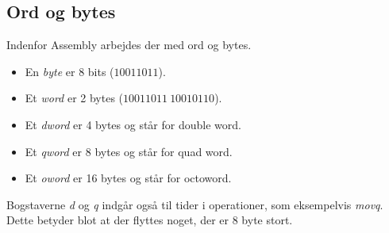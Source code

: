 \subsection{Ord og bytes}
Indenfor Assembly arbejdes der med ord og bytes.
\begin{itemize}
    \item En \textit{byte} er 8 bits ($10011011$).
    \item Et \textit{word} er 2 bytes ($10011011\:10010110$).
    \item Et \textit{dword} er 4 bytes og står for double word.
    \item Et \textit{qword} er 8 bytes og står for quad word.
    \item Et \textit{oword} er 16 bytes og står for octoword.
\end{itemize}
Bogstaverne \textit{d} og \textit{q} indgår også til tider i operationer, som eksempelvis \textit{movq}.
Dette betyder blot at der flyttes noget, der er 8 byte stort.

